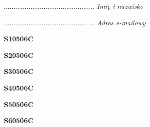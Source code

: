 \begin{turn}{90}\begin{minipage}{\linewidth} \vspace{20mm} ................................................  \textit{Imię i nazwisko}\end{minipage}\end{turn}

\begin{turn}{90}\begin{minipage}{\linewidth} \vspace{20mm} ................................................  \textit{Adres e-mailowy}\end{minipage}\end{turn}

\begin{turn}{90}\huge \begin{minipage}{\linewidth} \vspace{10mm}\textbf{S10506C}\end{minipage}\end{turn}

\begin{turn}{90}\huge \begin{minipage}{\linewidth} \vspace{10mm}\textbf{S20506C}\end{minipage}\end{turn}

\begin{turn}{90}\huge \begin{minipage}{\linewidth} \vspace{10mm}\textbf{S30506C}\end{minipage}\end{turn}

\begin{turn}{90}\huge \begin{minipage}{\linewidth} \vspace{10mm}\textbf{S40506C}\end{minipage}\end{turn}

\begin{turn}{90}\huge \begin{minipage}{\linewidth} \vspace{10mm}\textbf{S50506C}\end{minipage}\end{turn}

\begin{turn}{90}\huge \begin{minipage}{\linewidth} \vspace{10mm}\textbf{S60506C}\end{minipage}\end{turn}


